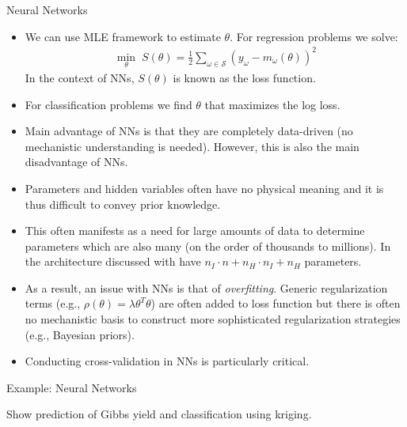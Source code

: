\documentclass[9pt]{beamer}
\begin{document}
\begin{frame}{Neural Networks}
\begin{itemize}
\item We can use MLE framework to estimate $\theta$. For regression problems we solve:
\begin{align*}
\min_{\theta}\; S(\theta)=\frac{1}{2}\sum_{\omega\in \mathcal{S}}(y_\omega - m_\omega(\theta))^2
\end{align*}
In the context of NNs, $S(\theta)$ is known as the loss function.  
\item For classification problems we find $\theta$ that maximizes the log loss. 

\item Main advantage of NNs is that they are completely data-driven (no mechanistic understanding is needed). However, this is also the main disadvantage of NNs. 

\item Parameters and hidden variables often have no physical meaning and it is thus difficult to convey prior knowledge. 

\item This often manifests as a need for large amounts of data to determine parameters which are also many (on the order of thousands to millions). In the architecture discussed with have $n_I\cdot n+n_H\cdot n_I+n_H$ parameters.

\item As a result, an issue with NNs is that of {\em overfitting}.  Generic regularization terms (e.g., $\rho(\theta)=\lambda \theta^T\theta$) are often added to loss function but there is often no mechanistic basis to construct more sophisticated regularization strategies (e.g., Bayesian priors). 

\item Conducting cross-validation in NNs is particularly critical. 

\end{itemize}

\end{frame}

%
\begin{frame}{Example: Neural Networks}

\begin{block}{}
Show prediction of Gibbs yield and classification using kriging. 
\end{block}

\end{frame}
\end{document}
